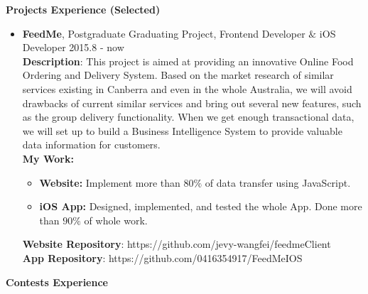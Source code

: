 \documentclass{res}
\newcommand{\resheading}[1]{{\normalsize \colorbox{mygrey}{\begin{minipage}{\textwidth}{\textbf{#1 \vphantom{p\^{E}}}}\end{minipage}}}}
\begin{document}
\begin{resume}
\begin{CJK*}{UTF8}{song}
\resheading{Projects Experience (Selected)}
\begin{itemize}
	\item {\bf FeedMe}, Postgraduate Graduating Project, Frontend Developer $\&$ iOS Developer \hfill 2015.8 - now	\vspace{3pt} \\	
\textbf{Description}: This project is aimed at providing an innovative Online Food Ordering and Delivery System. Based on the market research of similar services existing in Canberra and even in the whole Australia, we will avoid drawbacks of current similar services and bring out several new features, such as the group delivery functionality. When we get enough transactional data, we will set up to build a Business Intelligence System to provide valuable data information for customers. \vspace{2pt} \\
\textbf{My Work:}
	\begin{itemize}
		\item {\bf Website:} Implement more than $80\%$ of data transfer using JavaScript.
		\item {\bf iOS App:} Designed, implemented, and tested the whole App. Done more than $90\%$ of whole work.
	\end{itemize}	
\textbf{Website Repository}: https://github.com/jevy-wangfei/feedmeClient \vspace{2pt} \\
\textbf{App Repository}: https://github.com/0416354917/FeedMeIOS 
\end{itemize}



\resheading{Contests Experience}

\begin{itemize}


\end{itemize}
\end{CJK*}
\end{resume}
\end{document}
